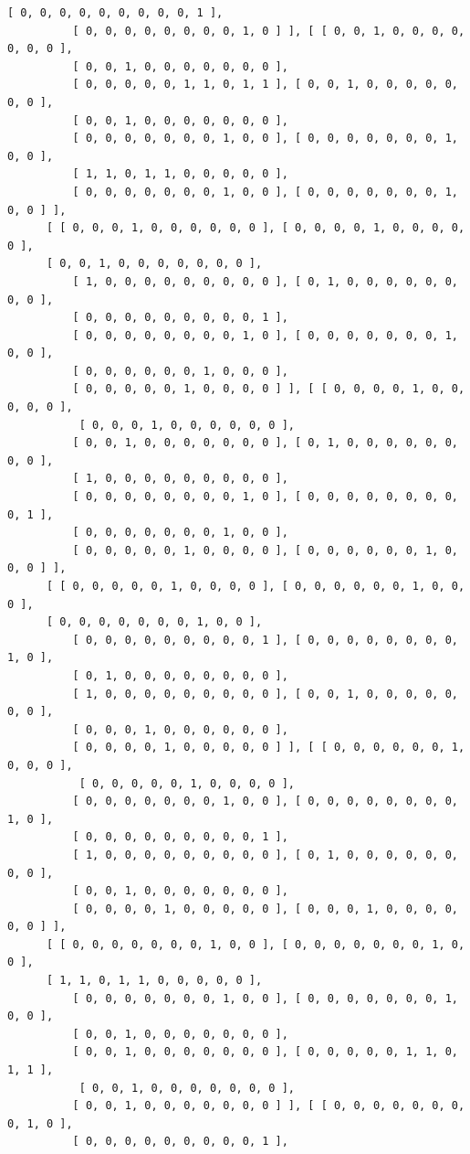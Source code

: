 \documentclass[a4paper, 10pt]{book}
\theoremstyle{definition}
\numberwithin{equation}{chapter}
\begin{document}
\begin{appendices}
\begin{enumerate}
\begin{lstlisting}[numbers=none]
          [ 0, 0, 0, 0, 0, 0, 0, 0, 0, 1 ], 
          [ 0, 0, 0, 0, 0, 0, 0, 0, 1, 0 ] ], [ [ 0, 0, 1, 0, 0, 0, 0, 0, 0, 0 ], 
          [ 0, 0, 1, 0, 0, 0, 0, 0, 0, 0 ], 
          [ 0, 0, 0, 0, 0, 1, 1, 0, 1, 1 ], [ 0, 0, 1, 0, 0, 0, 0, 0, 0, 0 ], 
          [ 0, 0, 1, 0, 0, 0, 0, 0, 0, 0 ], 
          [ 0, 0, 0, 0, 0, 0, 0, 1, 0, 0 ], [ 0, 0, 0, 0, 0, 0, 0, 1, 0, 0 ], 
          [ 1, 1, 0, 1, 1, 0, 0, 0, 0, 0 ], 
          [ 0, 0, 0, 0, 0, 0, 0, 1, 0, 0 ], [ 0, 0, 0, 0, 0, 0, 0, 1, 0, 0 ] ], 
      [ [ 0, 0, 0, 1, 0, 0, 0, 0, 0, 0 ], [ 0, 0, 0, 0, 1, 0, 0, 0, 0, 0 ], 
      [ 0, 0, 1, 0, 0, 0, 0, 0, 0, 0 ], 
          [ 1, 0, 0, 0, 0, 0, 0, 0, 0, 0 ], [ 0, 1, 0, 0, 0, 0, 0, 0, 0, 0 ], 
          [ 0, 0, 0, 0, 0, 0, 0, 0, 0, 1 ], 
          [ 0, 0, 0, 0, 0, 0, 0, 0, 1, 0 ], [ 0, 0, 0, 0, 0, 0, 0, 1, 0, 0 ], 
          [ 0, 0, 0, 0, 0, 0, 1, 0, 0, 0 ], 
          [ 0, 0, 0, 0, 0, 1, 0, 0, 0, 0 ] ], [ [ 0, 0, 0, 0, 1, 0, 0, 0, 0, 0 ],
           [ 0, 0, 0, 1, 0, 0, 0, 0, 0, 0 ], 
          [ 0, 0, 1, 0, 0, 0, 0, 0, 0, 0 ], [ 0, 1, 0, 0, 0, 0, 0, 0, 0, 0 ], 
          [ 1, 0, 0, 0, 0, 0, 0, 0, 0, 0 ], 
          [ 0, 0, 0, 0, 0, 0, 0, 0, 1, 0 ], [ 0, 0, 0, 0, 0, 0, 0, 0, 0, 1 ], 
          [ 0, 0, 0, 0, 0, 0, 0, 1, 0, 0 ], 
          [ 0, 0, 0, 0, 0, 1, 0, 0, 0, 0 ], [ 0, 0, 0, 0, 0, 0, 1, 0, 0, 0 ] ], 
      [ [ 0, 0, 0, 0, 0, 1, 0, 0, 0, 0 ], [ 0, 0, 0, 0, 0, 0, 1, 0, 0, 0 ], 
      [ 0, 0, 0, 0, 0, 0, 0, 1, 0, 0 ], 
          [ 0, 0, 0, 0, 0, 0, 0, 0, 0, 1 ], [ 0, 0, 0, 0, 0, 0, 0, 0, 1, 0 ], 
          [ 0, 1, 0, 0, 0, 0, 0, 0, 0, 0 ], 
          [ 1, 0, 0, 0, 0, 0, 0, 0, 0, 0 ], [ 0, 0, 1, 0, 0, 0, 0, 0, 0, 0 ], 
          [ 0, 0, 0, 1, 0, 0, 0, 0, 0, 0 ], 
          [ 0, 0, 0, 0, 1, 0, 0, 0, 0, 0 ] ], [ [ 0, 0, 0, 0, 0, 0, 1, 0, 0, 0 ],
           [ 0, 0, 0, 0, 0, 1, 0, 0, 0, 0 ], 
          [ 0, 0, 0, 0, 0, 0, 0, 1, 0, 0 ], [ 0, 0, 0, 0, 0, 0, 0, 0, 1, 0 ], 
          [ 0, 0, 0, 0, 0, 0, 0, 0, 0, 1 ], 
          [ 1, 0, 0, 0, 0, 0, 0, 0, 0, 0 ], [ 0, 1, 0, 0, 0, 0, 0, 0, 0, 0 ], 
          [ 0, 0, 1, 0, 0, 0, 0, 0, 0, 0 ], 
          [ 0, 0, 0, 0, 1, 0, 0, 0, 0, 0 ], [ 0, 0, 0, 1, 0, 0, 0, 0, 0, 0 ] ], 
      [ [ 0, 0, 0, 0, 0, 0, 0, 1, 0, 0 ], [ 0, 0, 0, 0, 0, 0, 0, 1, 0, 0 ], 
      [ 1, 1, 0, 1, 1, 0, 0, 0, 0, 0 ], 
          [ 0, 0, 0, 0, 0, 0, 0, 1, 0, 0 ], [ 0, 0, 0, 0, 0, 0, 0, 1, 0, 0 ], 
          [ 0, 0, 1, 0, 0, 0, 0, 0, 0, 0 ], 
          [ 0, 0, 1, 0, 0, 0, 0, 0, 0, 0 ], [ 0, 0, 0, 0, 0, 1, 1, 0, 1, 1 ],
           [ 0, 0, 1, 0, 0, 0, 0, 0, 0, 0 ], 
          [ 0, 0, 1, 0, 0, 0, 0, 0, 0, 0 ] ], [ [ 0, 0, 0, 0, 0, 0, 0, 0, 1, 0 ], 
          [ 0, 0, 0, 0, 0, 0, 0, 0, 0, 1 ], 

\end{lstlisting}
\end{enumerate}
\end{appendices}
\end{document}
